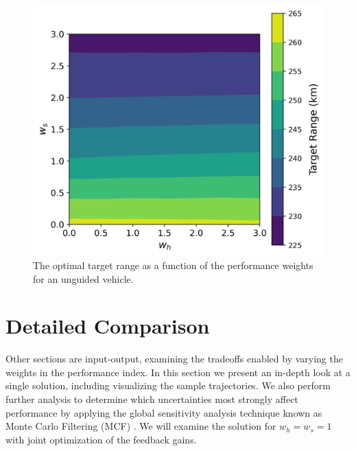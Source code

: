 \begin{figure}[h!]
	\centering
	\includegraphics[width=1\textwidth]{Images/OpenLoop_TargetRange}
	\caption{The optimal target range as a function of the performance weights for an unguided vehicle.}
	\label{Fig:MCTargetRangeOpenLoop}
\end{figure}

\section{Detailed Comparison}
Other sections are input-output, examining the tradeoffs enabled by varying the weights in the performance index. In this section we present an in-depth look at a single solution, including visualizing the sample trajectories. We also perform further analysis to determine which uncertainties most strongly affect performance by applying the global sensitivity analysis technique known as Monte Carlo Filtering (MCF) \cite{MonteCarloFiltering}. We will examine the solution for $w_h=w_s=1$ with joint optimization of the feedback gains. 

